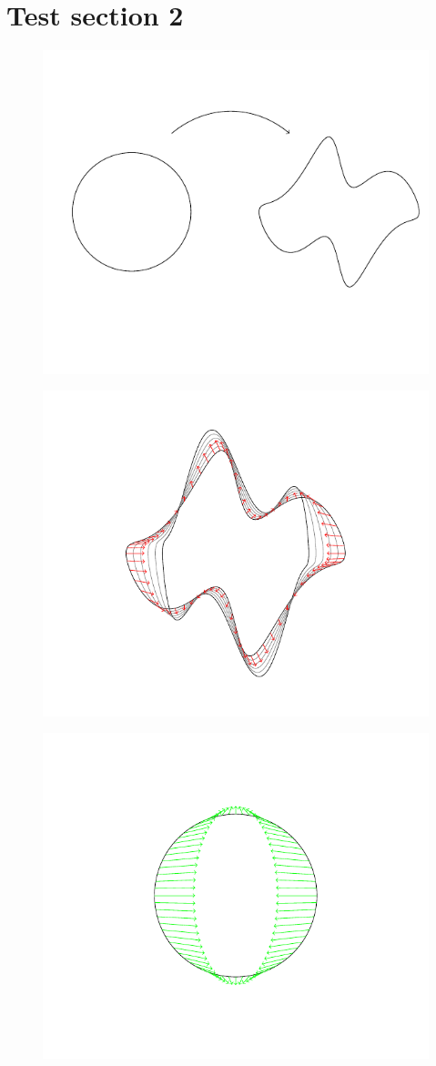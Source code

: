 \documentclass[a4,danish]{article}
\begin{document}
\section*{Test section 2}
\label{sec:test-section-2}

\begin{figure}
  \centerline{\includegraphics[width=0.7\linewidth]{circle_mapping.pdf}}
\end{figure}

\begin{figure}
  \centerline{\includegraphics[width=0.7\linewidth]{path.pdf}}
\end{figure}

\begin{figure}
  \centerline{\includegraphics[width=0.7\linewidth]{circle_vectorfield.pdf}}
\end{figure}
\end{document}

